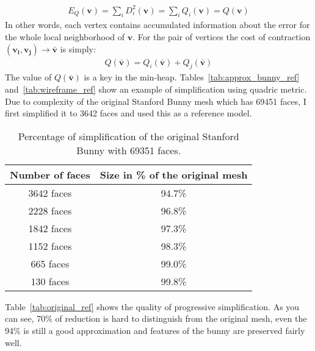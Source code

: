 \begin{align}
E_Q(\mathbf{v}) = \sum_{i} D_i^2(\mathbf{v}) = \sum_{i} Q_i(\mathbf{v}) = Q(\mathbf{v})
\end{align}
In other words, each vertex contains accumulated information about the error for the whole local neighborhood of $\mathbf{v}$. For the pair of vertices the cost of contraction $(\mathbf{v_i}, \mathbf{v_j})\rightarrow\bar{\mathbf{v}}$ is simply:
\begin{align}
Q(\mathbf{\bar{v}}) = Q_i(\mathbf{\bar{v}}) + Q_j(\mathbf{\bar{v}})
\end{align}
The value of $Q(\mathbf{\bar{v}})$ is a key in the min-heap. Tables~\ref{tab:approx_bunny_ref} and~\ref{tab:wireframe_ref} show an example of simplification using quadric metric. Due to complexity of the original Stanford Bunny mesh which has 69451 faces, I first simplified it to 3642 faces and used this as a reference model.

\begin{table}[h!]
\centering
\begin{tabular}{ |c|c| } 
 \hline
 Number of faces & Size in \% of the original mesh\\
 \hline
 3642 faces & 94.7\% \\ 
 2228 faces & 96.8\% \\ 
 1842 faces & 97.3\%\\ 
 1152 faces & 98.3\%\\ 
 665 faces & 99.0\%\\ 
 130 faces & 99.8\%\\
 \hline
\end{tabular}
\caption{Percentage of simplification of the original Stanford Bunny with 69351 faces.}
\end{table}
Table~\ref{tab:original_ref} shows the quality of progressive simplification. As you can see, 70\% of reduction is hard to distinguish from the original mesh, even the 94\% is still a good approximation and features of the bunny are preserved fairly well.

